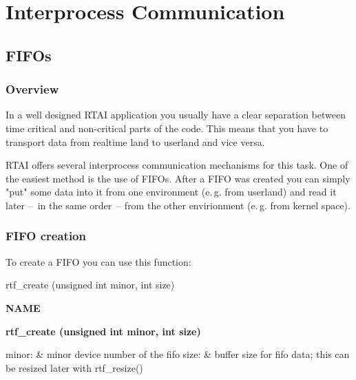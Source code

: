\chapter{Interprocess Communication}

\section{FIFOs}


\subsection{Overview}

In a well designed RTAI application you usually have a clear separation 
between time critical and non-critical parts of the code. This means
that you have to transport data from realtime land to userland and vice
versa. 

RTAI offers several interprocess communication mechanisms for this task.
One of the easiest method is the use of FIFOs. After a FIFO was created
you can simply "put" some data into it from one environment (e.\,g. from
userland) and read it later --~in the same order~-- from the other
envirionment (e.\,g. from kernel space). 


\subsection{FIFO creation}

To create a FIFO you can use this function: 

%



\begin{code}
	rtf_create (unsigned int minor, int size)
\end{code}


%


\textbf{NAME}

	\textbf{rtf\_create (unsigned int minor, int size)}

	minor: \& minor device number of the fifo
	size: \& buffer size for fifo data; this can be resized later
	with rtf\_resize()

